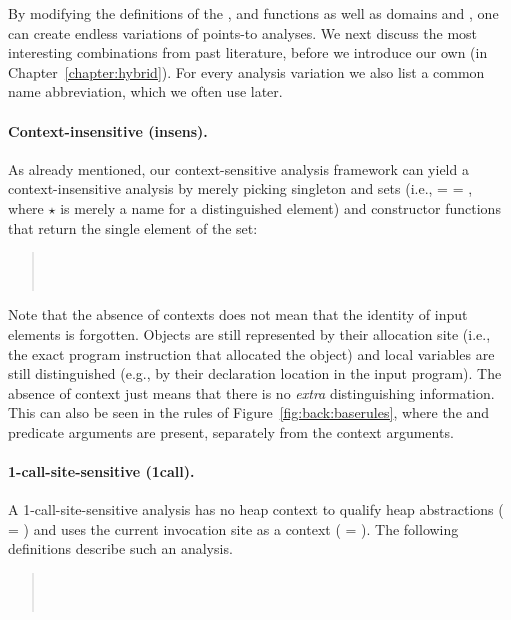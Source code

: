 By modifying the definitions of the ,  and  functions as well as domains  and , one can create endless variations of points-to analyses. We next discuss the most interesting combinations from past literature, before we introduce our own (in Chapter~\ref{chapter:hybrid}). For every analysis variation we also list a common name abbreviation, which we often use later.

\paragraph*{Context-insensitive (insens).}
As already mentioned, our context-sensitive analysis framework can yield a context-insensitive analysis by merely picking singleton  and  sets (i.e.,  =  = \args{\{$\star$\}}, where $\star$ is merely a name for a distinguished element) and constructor functions that return the single element of the set:

\begin{quote}
\\
 \\
\end{quote}

Note that the absence of contexts does not mean that the identity of input elements is forgotten. Objects are still represented by their allocation site (i.e., the exact program instruction that allocated the object) and local variables are still distinguished (e.g., by their declaration location in the input program). The absence of context just means that there is no \emph{extra} distinguishing information. This can also be seen in the rules of Figure~\ref{fig:back:baserules}, where the  and  predicate arguments are present, separately from the context arguments.

\paragraph*{1-call-site-sensitive (1call).}
A 1-call-site-sensitive analysis has no heap context to qualify heap abstractions ( = \args{\{$\star$\}}) and uses the current invocation site as a context ( = ). The following definitions describe such an analysis.

\begin{quote}
 \\
 \\
\end{quote}

